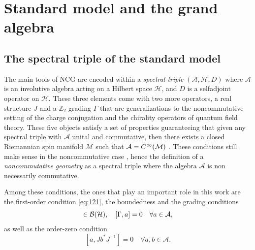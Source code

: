 \documentclass[11pt]{article}
\newcommand{\cinf}{{C^\infty({\cal M})}}
\newcommand{\M}{\mathcal M}
\newcommand{\A}{\mathcal A}
\newcommand{\HH}{\mathcal H}
\begin{document}
\section{Standard model and the grand algebra}
\setcounter{equation}{0}
\label{sectionSM}

\subsection{The spectral triple of the standard model}
\label{spectraltripleSM}

The main tools of NCG \cite{Connes:1994kx} are encoded
  within a \emph{spectral triple} $(\A,
  \HH, D)$ where $\A$ is an involutive algebra acting on a Hilbert
  space $\HH$, and $D$ is a selfadjoint operator on $\HH$. These
  three elements come with two more operators, a real structure $J$
  \cite{Connes:1995kx} and a ${\mathbb Z}_2$-grading 
  $\Gamma$  that are generalizations to the noncommutative setting of 
  the charge conjugation and the chirality operators of quantum field
  theory. These five objects satisfy a set of properties guaranteeing that given any
  spectral triple with $\A$ unital and commutative, then there exists
  a closed Riemannian spin manifold $\M$ such that $\A=\cinf$ \cite{connesreconstruct}. These
  conditions still make sense in the noncommutative case \cite{Connes:1996fu}, hence the
  definition of a \emph{noncommutative geometry} as a spectral triple
  where the algebra $\A$ is non necessarily commutative. 

Among these conditions, the ones that play an important role in this work are the first-order condition \eqref{eq:121}, the boundedness and the grading conditions 
  \begin{equation}
[D,a]\in  {\cal B}(\HH),\quad  [\Gamma,a]=0 \quad \forall a\in\A,
\label{eq:136}
  \end{equation}
as well as the order-zero condition
\begin{equation}
  \label{eq:138}
  [a, Jb^* J^{-1}]=0 \quad \forall a,b\in \A.
\end{equation}
\end{document}
